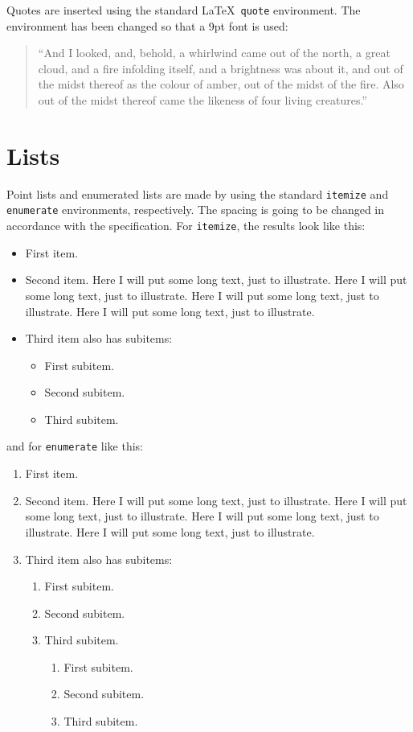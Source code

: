 Quotes are inserted using the standard \LaTeX\ \texttt{quote}
environment. The environment has been changed so that a 9pt font is
used:

\begin{quote}
  ``And I looked, and, behold, a whirlwind came out of the north, a
  great cloud, and a fire infolding itself, and a brightness was about
  it, and out of the midst thereof as the colour of amber, out of the
  midst of the fire. Also out of the midst thereof came the likeness
  of four living creatures.''
\end{quote}

\section{Lists}
\label{sec:lists}

Point lists and enumerated lists are made by using the standard
\texttt{itemize} and \texttt{enumerate} environments, respectively.
The spacing is going to be changed in accordance with the specification. For
\texttt{itemize}, the results look like this:
\begin{itemize}
	\item First item.
	\item Second item. Here I will put some long text, just to illustrate.
	  Here I will put some long text, just to illustrate. Here I will put
	  some long text, just to illustrate. Here I will put some long text,
	  just to illustrate.
	\item Third item also has subitems:
	  \begin{itemize}
		  \item First subitem.
		  \item Second subitem.
		  \item Third subitem.
			  \end{itemize}
\end{itemize}
and for \texttt{enumerate} like this:
\begin{enumerate}
	\item First item.
	\item Second item. Here I will put some long text, just to illustrate.
	  Here I will put some long text, just to illustrate. Here I will put
	  some long text, just to illustrate. Here I will put some long text,
	  just to illustrate.
	\item Third item also has subitems:
	  \begin{enumerate}
		  \item First subitem.
		  \item Second subitem.
		  \item Third subitem.	  
			\begin{enumerate}
		  \item First subitem.
		  \item Second subitem.
		  \item Third subitem.
	  \end{enumerate}
	  \end{enumerate}
\end{enumerate}

